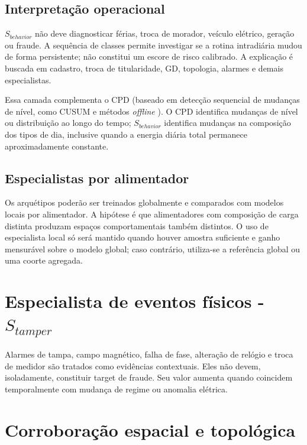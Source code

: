 \subsection{Interpretação operacional}\label{interpretauxe7uxe3o-operacional}

\(S_{behavior}\) não deve diagnosticar férias, troca de morador, veículo elétrico, geração ou fraude. A sequência de classes permite investigar se a rotina intradiária mudou de forma persistente; não constitui um escore de risco calibrado. A explicação é buscada em cadastro, troca de titularidade, GD, topologia, alarmes e demais especialistas.

Essa camada complementa o CPD (baseado em detecção sequencial de mudanças de nível, como CUSUM \autocite{page1954} e métodos \textit{offline} \autocite{truong2020}). O CPD identifica mudanças de nível ou distribuição ao longo do tempo; \(S_{behavior}\) identifica mudanças na composição dos tipos de dia, inclusive quando a energia diária total permanece aproximadamente constante.

\subsection{Especialistas por alimentador}\label{especialistas-por-alimentador}

Os arquétipos poderão ser treinados globalmente e comparados com modelos locais por alimentador. A hipótese é que alimentadores com composição de carga distinta produzam espaços comportamentais também distintos. O uso de especialista local só será mantido quando houver amostra suficiente e ganho mensurável sobre o modelo global; caso contrário, utiliza-se a referência global ou uma coorte agregada.

\section{\texorpdfstring{Especialista de eventos físicos - \(S_{tamper}\)}{Especialista de eventos físicos - S\_\{tamper\}}}\label{especialista-de-eventos-fuxedsicos---s_tamper}

Alarmes de tampa, campo magnético, falha de fase, alteração de relógio e troca de medidor são tratados como evidências contextuais. Eles não devem, isoladamente, constituir target de fraude. Seu valor aumenta quando coincidem temporalmente com mudança de regime ou anomalia elétrica.

\section{Corroboração espacial e topológica}\label{corroborauxe7uxe3o-espacial-e-topoluxf3gica}

